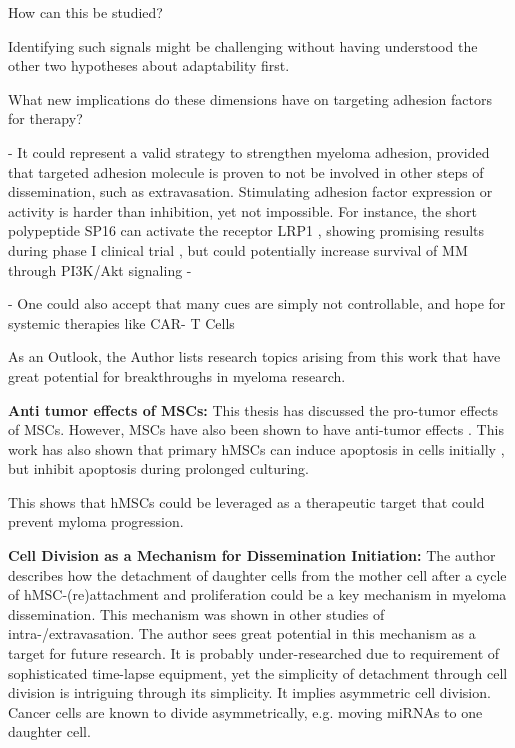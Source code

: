 How can this be studied?

Identifying such signals might be challenging without
having understood the other two hypotheses about adaptability first.




What new implications do these dimensions have on targeting adhesion factors for
therapy?


- It could represent a valid strategy to
strengthen myeloma adhesion, provided that targeted adhesion molecule is proven
to not be involved in other steps of dissemination, such as extravasation.
Stimulating adhesion factor expression or activity is harder than inhibition,
yet not impossible. For instance, the short polypeptide SP16 can activate the
receptor LRP1 , showing promising results during phase I
clinical trial \cite{wohlfordPhaseClinicalTrial2021}, but could potentially
increase survival of MM through PI3K/Akt signaling
\cite{potereDevelopingLRP1Agonists2019, heinemannInhibitingPI3KAKT2022} -

- One could also accept that many cues are simply not controllable, and hope for
systemic therapies like CAR- T Cells









\label{sec:discussion_potential_breakthroughs}
As an Outlook, the Author lists research topics arising from this work that have
great potential for breakthroughs in myeloma research.

\textbf{Anti tumor effects of MSCs:}
This thesis has discussed the pro-tumor effects of MSCs. However, MSCs have also
been shown to have anti-tumor effects \cite{galderisiMyelomaCellsCan2015}. This
work has also shown that primary \acp{hMSC} can induce apoptosis in  cells
initially ,
but inhibit apoptosis during prolonged culturing.

This shows that hMSCs could be leveraged
as a therapeutic target that could prevent myloma progression.




\textbf{Cell Division as a Mechanism for Dissemination Initiation:}
The author describes how the detachment of daughter cells from the mother cell
after a cycle of hMSC-(re)attachment and proliferation could be a key mechanism
in myeloma dissemination. This mechanism was shown in other studies of
intra-/extravasation. The author sees great potential in this mechanism as a
target for future research. It is probably under-researched due to requirement
of sophisticated time-lapse equipment, yet the simplicity of detachment through
cell division is intriguing through its simplicity. It implies asymmetric cell
division. Cancer cells are known to divide asymmetrically, e.g. moving miRNAs to
one daughter cell.


